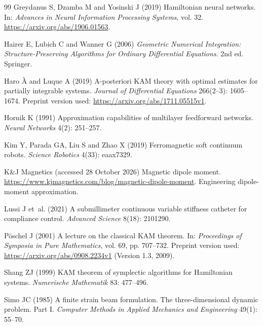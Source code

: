 \begin{thebibliography}{99}
Greydanus S, Dzamba M and Yosinski J (2019) Hamiltonian neural networks.
In: \textit{Advances in Neural Information Processing Systems}, vol. 32.
\url{https://arxiv.org/abs/1906.01563}.

Hairer E, Lubich C and Wanner G (2006) \textit{Geometric Numerical Integration:
Structure-Preserving Algorithms for Ordinary Differential Equations}. 2nd ed. Springer.

Haro \`A and Luque A (2019) A-posteriori KAM theory with optimal estimates for
partially integrable systems. \textit{Journal of Differential Equations}
266(2--3): 1605--1674. 
Preprint version used: \url{https://arxiv.org/abs/1711.05515v1}.

Hornik K (1991) Approximation capabilities of multilayer feedforward networks.
\textit{Neural Networks} 4(2): 251--257. 

Kim Y, Parada GA, Liu S and Zhao X (2019) Ferromagnetic soft continuum robots.
\textit{Science Robotics} 4(33): eaax7329. 

K\&J Magnetics (accessed 28 October 2026) Magnetic dipole moment.
\url{https://www.kjmagnetics.com/blog/magnetic-dipole-moment}.
Engineering dipole-moment approximation.

Lussi J et~al. (2021) A submillimeter continuous variable stiffness catheter for compliance control.
\textit{Advanced Science} 8(18): 2101290. 

P\"oschel J (2001) A lecture on the classical KAM theorem.
In: \textit{Proceedings of Symposia in Pure Mathematics}, vol. 69, pp. 707--732.
Preprint version used: \url{https://arxiv.org/abs/0908.2234v1} (Version 1.3, 2009).

Shang ZJ (1999) KAM theorem of symplectic algorithms for Hamiltonian systems.
\textit{Numerische Mathematik} 83: 477--496. 

Simo JC (1985) A finite strain beam formulation. The three-dimensional dynamic problem.
Part I. \textit{Computer Methods in Applied Mechanics and Engineering} 49(1): 55--70.


\end{thebibliography}
